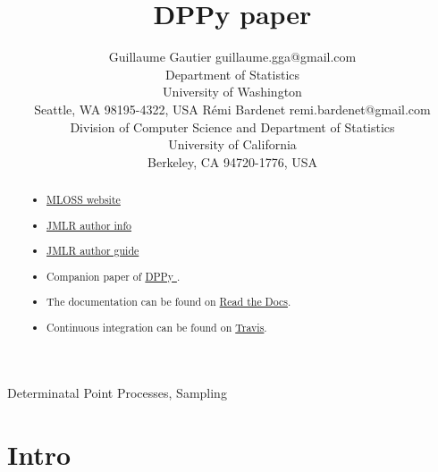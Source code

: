 \documentclass[twoside,11pt]{article}
\begin{document}
\title{DPPy paper}

\author{\name Guillaume Gautier \email guillaume.gga@gmail.com \\
       \addr Department of Statistics\\
       University of Washington\\
       Seattle, WA 98195-4322, USA
       \AND
       \name R\'emi Bardenet \email remi.bardenet@gmail.com \\
       \addr Division of Computer Science and Department of Statistics\\
       University of California\\
       Berkeley, CA 94720-1776, USA}

\editor{}

\maketitle

\begin{abstract}%

  \begin{itemize}
    \item \href{http://www.jmlr.org/mloss/mloss-info.html}{MLOSS website}
    \item \href{http://jmlr.csail.mit.edu/author-info.html}{JMLR author info}
    \item \href{http://www.jmlr.org/format/authors-guide.html}{JMLR author guide} 
  \end{itemize}

  \begin{itemize}
    \item Companion paper of \href{https://github.com/guilgautier/DPPy}{DPPy \faGithub}.
    \item The documentation can be found on \href{https://dppy.readthedocs.io/en/latest/?badge=latest}{Read the Docs}.
    \item Continuous integration can be found on \href{https://travis-ci.com/guilgautier/DPPy}{Travis}.
  \end{itemize}

\end{abstract}

\begin{keywords}
  Determinatal Point Processes, Sampling
\end{keywords}

\section{Intro} %
\label{sec:intro}
\end{document}
